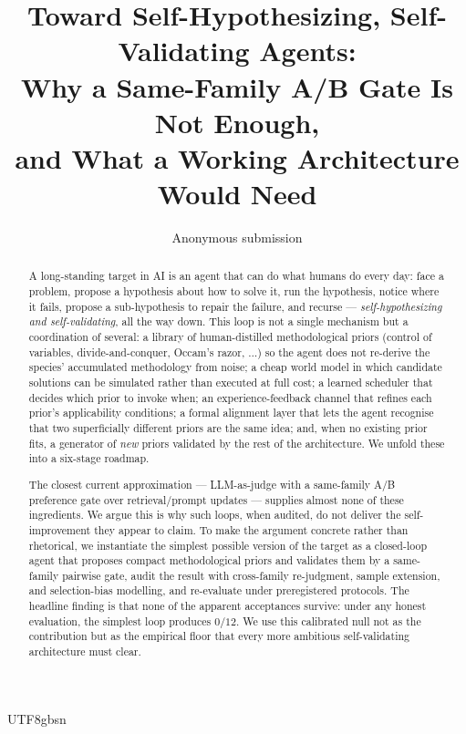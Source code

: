 \documentclass{article}
\title{\textbf{Toward Self-Hypothesizing, Self-Validating Agents:}\\
Why a Same-Family A/B Gate Is Not Enough,\\
and What a Working Architecture Would Need}
\author{%
  Anonymous submission\\
}
\date{}
\begin{document}
\begin{CJK*}{UTF8}{gbsn}
\maketitle

\begin{abstract}
\noindent A long-standing target in AI is an agent that can do
what humans do every day: face a problem, propose a hypothesis
about how to solve it, run the hypothesis, notice where it fails,
propose a sub-hypothesis to repair the failure, and recurse ---
\emph{self-hypothesizing and self-validating}, all the way down.
This loop is not a single mechanism but a coordination of several:
a library of human-distilled methodological priors (control of
variables, divide-and-conquer, Occam's razor, $\ldots$) so the
agent does not re-derive the species' accumulated methodology
from noise; a cheap world model in which candidate solutions can
be simulated rather than executed at full cost; a learned
scheduler that decides which prior to invoke when; an
experience-feedback channel that refines each prior's
applicability conditions; a formal alignment layer that lets the
agent recognise that two superficially different priors are the
same idea; and, when no existing prior fits, a generator of
\emph{new} priors validated by the rest of the architecture. We
unfold these into a six-stage roadmap.

\noindent The closest current approximation --- LLM-as-judge with
a same-family A/B preference gate over retrieval/prompt updates
--- supplies almost none of these ingredients. We argue this is
why such loops, when audited, do not deliver the
self-improvement they appear to claim. To make the argument
concrete rather than rhetorical, we instantiate the simplest
possible version of the target as a closed-loop agent that
proposes compact methodological priors and validates them by a
same-family pairwise gate, audit the result with cross-family
re-judgment, sample extension, and selection-bias modelling, and
re-evaluate under preregistered protocols. The headline finding
is that none of the apparent acceptances survive: under any
honest evaluation, the simplest loop produces \(0/12\). We use
this calibrated null not as the contribution but as the
empirical floor that every more ambitious self-validating
architecture must clear.


\end{abstract}
\end{CJK*}
\end{document}
